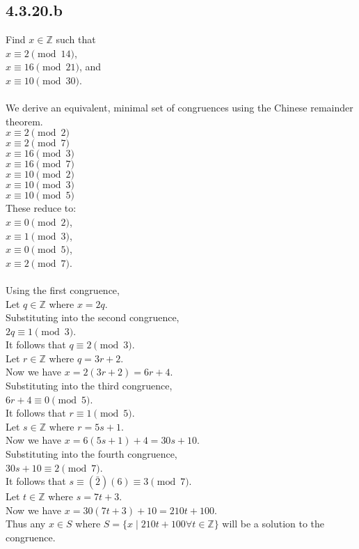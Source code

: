 \documentclass{article}
\begin{document}
\subsection{4.3.20.b}
Find $x\in\mathbb{Z}$ such that\
\\$x\equiv2\pmod{14}$,
\\$x\equiv16\pmod{21}$, and
\\$x\equiv10\pmod{30}$.
\\
\\We derive an equivalent, minimal set of congruences
using the Chinese remainder theorem.
\\$x\equiv2\pmod{2}$
\\$x\equiv2\pmod{7}$
\\$x\equiv16\pmod{3}$
\\$x\equiv16\pmod{7}$
\\$x\equiv10\pmod{2}$
\\$x\equiv10\pmod{3}$
\\$x\equiv10\pmod{5}$
\\These reduce to:
\\$x\equiv0\pmod{2}$,
\\$x\equiv1\pmod{3}$,
\\$x\equiv0\pmod{5}$,
\\$x\equiv2\pmod{7}$.
\\
\\Using the first congruence,
\\Let $q \in \mathbb{Z}$ where $x=2q$.
\\Substituting into the second congruence,
\\$2q \equiv 1 \pmod{3}$.
\\It follows that $q \equiv 2 \pmod{3}$.
\\Let $r \in \mathbb{Z}$ where $q=3r+2$.
\\Now we have $x=2(3r+2)=6r+4$.
\\Substituting into the third congruence,
\\$6r + 4 \equiv 0 \pmod{5}$.
\\It follows that $r \equiv 1 \pmod{5}$.
\\Let $s \in \mathbb{Z}$ where $r=5s+1$.
\\Now we have $x=6(5s+1)+4=30s+10$.
\\Substituting into the fourth congruence,
\\$30s + 10 \equiv 2 \pmod{7}$.
\\It follows that $s \equiv (\bar{2})(6) \equiv 3 \pmod{7}$.
\\Let $t \in \mathbb{Z}$ where $s=7t+3$.
\\Now we have $x=30(7t+3)+10=210t+100$.
\\Thus any $x \in S$ where
$S = \{x \mid 210t+100 $\;\;$\forall t \in \mathbb{Z}\}$
will be a solution to the congruence.
\end{document}
